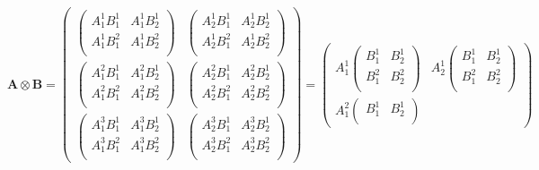 \documentclass[a4paper,11pt]{article}
\begin{document}
\begin{equation}
  \mathbf{A} \otimes \mathbf{B} =
  \begin{pmatrix}
    \begin{pmatrix}
      A^1_1B^1_1 & A^1_1B^1_2 \\
      A^1_1B^2_1 & A^1_1B^2_2 \\
    \end{pmatrix}
    &
    \begin{pmatrix}
      A^1_2B^1_1 & A^1_2B^1_2 \\
      A^1_2B^2_1 & A^1_2B^2_2 \\
    \end{pmatrix}
    \\
    \begin{pmatrix}
      A^2_1B^1_1 & A^2_1B^1_2 \\
      A^2_1B^2_1 & A^2_1B^2_2 \\
    \end{pmatrix}
    &
    \begin{pmatrix}
      A^2_2B^1_1 & A^2_2B^1_2 \\
      A^2_2B^2_1 & A^2_2B^2_2 \\
    \end{pmatrix}
    \\
    \begin{pmatrix}
      A^3_1B^1_1 & A^3_1B^1_2 \\
      A^3_1B^2_1 & A^3_1B^2_2 \\
    \end{pmatrix}
    &
    \begin{pmatrix}
      A^3_2B^1_1 & A^3_2B^1_2 \\
      A^3_2B^2_1 & A^3_2B^2_2 \\
    \end{pmatrix}
  \end{pmatrix}
  =
  \begin{pmatrix}
    A^1_1
    \begin{pmatrix}
      B^1_1 & B^1_2 \\
      B^2_1 & B^2_2 \\
    \end{pmatrix}
    &
    A^1_2
    \begin{pmatrix}
      B^1_1 & B^1_2 \\
      B^2_1 & B^2_2 \\
    \end{pmatrix}
    \\
    A^2_1
    \begin{pmatrix}
      B^1_1 & B^1_2 \\

\end{pmatrix}
\end{pmatrix}
\end{equation}
\end{document}
